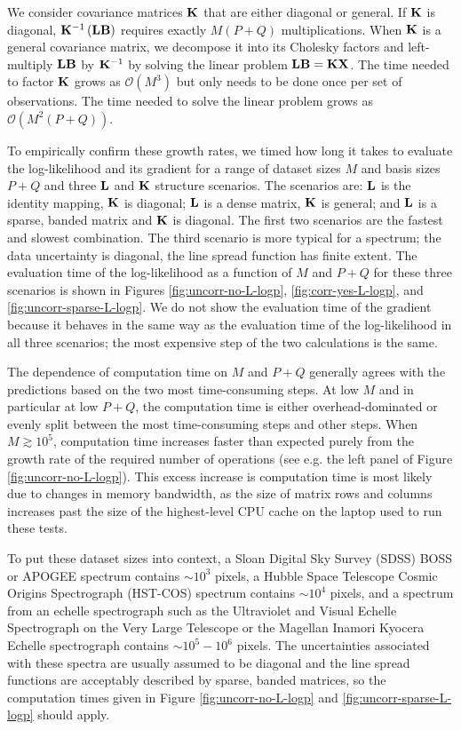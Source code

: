 \documentclass[manuscript]{aastex62}
\newcommand{\vx}[1]{{\bf {#1}}}
\begin{document}
We consider covariance matrices $\vx{K}$ that are either diagonal or general.
If $\vx{K}$ is diagonal, $\vx{K}^{-1} \left(\vx{L} \vx{B}\right)$ requires exactly $M(P+Q)$ multiplications.
When $\vx{K}$ is a general covariance matrix, we decompose it into its Cholesky factors and left-multiply $\vx{L} \vx{B}$ by $\vx{K}^{-1}$ by solving the linear problem $\vx{\vx{L} \vx{B}} = \vx{K} \vx{X}$.
The time needed to factor $\vx{K}$ grows as $\mathcal{O}\left(M^3\right)$ but only needs to be done once per set of observations.
The time needed to solve the linear problem grows as $\mathcal{O}\left(M^2 (P+Q)\right)$.

To empirically confirm these growth rates, we timed how long it takes to evaluate the log-likelihood and its gradient for a range of dataset sizes $M$ and basis sizes $P+Q$ and three $\vx{L}$ and $\vx{K}$ structure scenarios.
The scenarios are: $\vx{L}$ is the identity mapping, $\vx{K}$ is diagonal; $\vx{L}$ is a dense matrix, $\vx{K}$ is general; and $\vx{L}$ is a sparse, banded matrix and $\vx{K}$ is diagonal.
The first two scenarios are the fastest and slowest combination.
The third scenario is more typical for a spectrum; the data uncertainty is diagonal, the line spread function has finite extent.
The evaluation time of the log-likelihood as a function of $M$ and $P+Q$ for these three scenarios is shown in Figures \ref{fig:uncorr-no-L-logp}, \ref{fig:corr-yes-L-logp}, and \ref{fig:uncorr-sparse-L-logp}.
We do not show the evaluation time of the gradient because it behaves in the same way as the evaluation time of the log-likelihood in all three scenarios; the most expensive step of the two calculations is the same.

The dependence of computation time on $M$ and $P+Q$ generally agrees with the predictions based on the two most time-consuming steps.
At low $M$ and in particular at low $P+Q$, the computation time is either overhead-dominated or evenly split between the most time-consuming steps and other steps.
When $M \gtrsim 10^5$, computation time increases faster than expected purely from the growth rate of the required number of operations (see e.g. the left panel of Figure \ref{fig:uncorr-no-L-logp}).
This excess increase is computation time is most likely due to changes in memory bandwidth, as the size of matrix rows and columns increases past the size of the highest-level CPU cache on the laptop used to run these tests.

To put these dataset sizes into context, a Sloan Digital Sky Survey (SDSS) BOSS or APOGEE spectrum contains $\sim 10^3$ pixels, a Hubble Space Telescope Cosmic Origins Spectrograph (HST-COS) spectrum contains $\sim 10^4$ pixels, and a spectrum from an echelle spectrograph such as the Ultraviolet and Visual Echelle Spectrograph on the Very Large Telescope or the Magellan Inamori Kyocera Echelle spectrograph contains $\sim 10^5 - 10^6$ pixels.
The uncertainties associated with these spectra are usually assumed to be diagonal and the line spread functions are acceptably described by sparse, banded matrices, so the computation times given in Figure \ref{fig:uncorr-no-L-logp} and \ref{fig:uncorr-sparse-L-logp} should apply.
\end{document}
